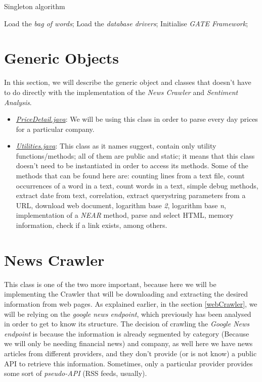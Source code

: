 \begin{algorithm}
\caption{Singleton algorithm}\label{singletonAlgorithm}
\begin{algorithmic}[1]

		\STATE Load the \emph{bag of words};
		\STATE Load the \emph{database drivers};
		\STATE Initialise \emph{GATE Framework};
\ENDIF
\end{algorithmic}
\end{algorithm}

\section{Generic Objects}

In this section, we will describe the generic object and classes that doesn't have to do directly with the implementation of the \emph{News Crawler} and \emph{Sentiment Analysis}.

\begin{itemize}
	\item \emph{\ul{PriceDetail.java}}: We will be using this class in order to parse every day prices for a particular company.
	\item \emph{\ul{Utilities.java}}: This class as it names suggest, contain only utility functions/methods; all of them are public and static; it means that this class doesn't need to be instantiated in order to access its methods. Some of the methods that can be found here are: counting lines from a text file, count occurrences of a word in a text, count words in a text, simple debug methods, extract date from text, correlation, extract querystring parameters from a URL, download web document, logarithm base \emph{2}, logarithm base \emph{n}, implementation of a \emph{NEAR} method, parse and select HTML, memory information, check if a link exists, among others.
\end{itemize}

\section{News Crawler}

This class is one of the two more important, because here we will be implementing the Crawler that will be downloading and extracting the desired information from web pages. As explained earlier, in the section \ref{webCrawler}, we will be relying on the \emph{google news endpoint}, which previously has been analysed in order to get to know its structure. The decision of crawling the \emph{Google News endpoint} is because the information is already segmented by category (Because we will only be needing financial news) and company, as well here we have news articles from different providers, and they don't provide (or is not know) a public API to retrieve this information. Sometimes, only a particular provider provides some sort of \emph{pseudo-API} (RSS feeds, usually).

